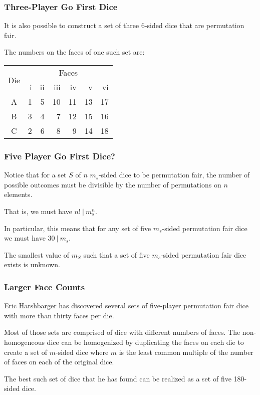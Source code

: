 \documentclass[aspectratio=169]{beamer}
\begin{document}
\begin{frame}[triangle=siiblue]
\frametitle{Three-Player Go First Dice}
It is also possible to construct a set of three 6-sided dice that are permutation fair. 

\vfill

The numbers on the faces of one such set are:
{
\footnotesize
\begin{table}
\begin{tabular}{c rrrrrr} \toprule
\multirow{2}[2]{*}{Die} &  \multicolumn{6}{c}{Faces} \\ \cmidrule(lr){2-7}     
   & i & ii & iii & iv & v & vi \\ \midrule
A & 1 & 5 & 10 & 11 & 13 & 17 \\
B & 3 & 4 & 7 & 12 & 15 & 16 \\
C & 2 & 6 & 8 & 9 & 14 & 18 \\ \bottomrule
\end{tabular}
\end{table}
}
\end{frame}

\begin{frame}[triangle=siiblue]
\frametitle{Five Player Go First Dice?}
Notice that for a set $S$ of $n$ $m_s$-sided dice to be permutation fair,  the number of possible outcomes must be divisible by the number of permutations on $n$ elements.

\vfill

That is, we must have $n! \ \vert \ m_s^{n}$.

\vfill

In particular, this means that for any set of five $m_s$-sided permutation fair dice we must have $ 30 \ \vert \ m_s$.

\vfill

The smallest value of $m_S$ such that a set of five $m_s$-sided permutation fair dice exists is unknown.

\end{frame}

\begin{frame}[triangle=siiblue]
\frametitle{Larger Face Counts}
Eric Harshbarger has discovered several sets of five-player permutation fair dice with more than thirty faces per die.

\vfill

Most of those sets are comprised of dice with different numbers of faces.  The non-homogeneous dice can be homogenized by duplicating the faces on each die to create a set of $m$-sided dice where $m$ is the least common multiple of the number of faces on each of the original dice.

\vfill

The best such set of dice that he has found can be realized as a set of five 180-sided dice.
\end{frame}
\end{document}
